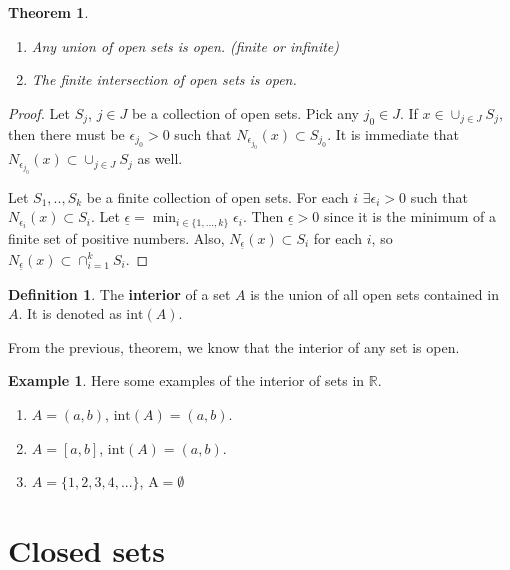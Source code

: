 \documentclass[12pt,reqno]{amsart}
\newtheorem{theorem}{Theorem}[section]
\theoremstyle{definition}
\newtheorem{definition}{Definition}[section]
\newtheorem{example}{Example}[section]
\def\R{\mathbb{R}}
\begin{document}
\begin{theorem} $\,$
  \begin{enumerate} \label{thm:uio}
  \item Any union of open sets is open. (finite or infinite)
  \item The \emph{finite} intersection of open sets is open.
  \end{enumerate}
\end{theorem}
\begin{proof}
  Let $S_j$, $j \in J$ be a collection of open sets. Pick any $j_0 \in
  J$. If $x \in \cup_{j \in J} S_j$, then there must be $\epsilon_{j_0} >
  0$ such that $N_{\epsilon_{j_0}} (x) \subset S_{j_0}$. It is
  immediate that $N_{\epsilon_{j_0}} (x) \subset \cup_{j \in J} S_j$
  as well. 

  Let $S_1, .., S_k$ be a finite collection of open sets. For each $i$
  $\exists \epsilon_i > 0$ such that $N_{\epsilon_i}(x) \subset
  S_i$. Let $\underline{\epsilon} = \min_{i \in \{1,..., k\}}
  \epsilon_i$. Then $\underline{\epsilon}>0$ since it is the minimum
  of a finite set of positive numbers. Also,
  $N_{\underline{\epsilon}}(x) \subset S_i$ for each $i$, so
  $N_{\underline{\epsilon}}(x) \subset \cap_{i=1}^k S_i$. 
\end{proof}
\begin{definition}
  The \textbf{interior} of a set $A$ is the union of all open sets
  contained in $A$. It is denoted as $\mathrm{int}(A)$.
\end{definition}
From the previous, theorem, we know that the interior of any set is
open. 
\begin{example}
  Here some examples of the interior of sets in $\R$.
  \begin{enumerate}
  \item $A = (a,b)$, $\mathrm{int}(A) = (a,b)$.
  \item $A = [a,b]$, $\mathrm{int}(A) = (a,b)$.
  \item $A = \{1, 2, 3, 4, ... \}$, $\mathrm{A} = \emptyset$
  \end{enumerate}  
\end{example}

\section{Closed sets}
\end{document}
